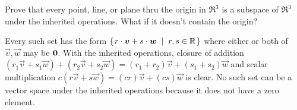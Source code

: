 

\begin{Exercise}[
name={},
title={}, 
difficulty=0,
origin={\cite{JH}}]
\Question Prove that every point, line, or plane thru the origin in 
\( \Re^3 \) is a subspace of \( \Re^3 \) under the inherited operations.
\Question What if it doesn't contain the origin?
\end{Exercise}

\begin{Answer}
\Question Every such set has the form
        \( \mbox{$\left\{\hspace{0.1em}r\cdot\bm{v}+s\cdot\bm{w}\;\;\middle|\;\; r,s\in\mathbb{R}\hspace{0.1em}\right\}$} \)
        where either or both of \( \vec{v},\vec{w} \) may be \( \bm{0} \).
        With the inherited operations, closure of addition
        \( (r_1\vec{v}+s_1\vec{w})+(r_2\vec{v}+s_2\vec{w})
           =(r_1+r_2)\vec{v}+(s_1+s_2)\vec{w} \)
        and scalar multiplication
        \( c(r\vec{v}+s\vec{w})=(cr)\vec{v}+(cs)\vec{w} \) is clear.
\Question No such set can be a vector space under the inherited
        operations because it does not have a zero element.
\end{Answer}
